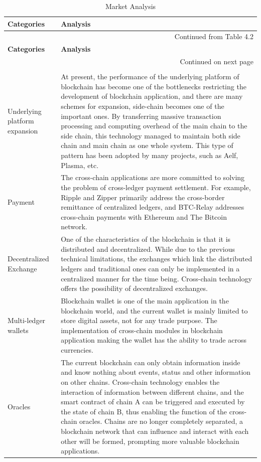 \begin{longtable}{l|p{7cm}}
 \caption{\label{tab:app}Market Analysis}\\
 \toprule
\textbf{Categories} &\textbf{Analysis}\\
\midrule\endfirsthead
\multicolumn{2}{r}{Continued from Table 4.2}\\\hline 
\textbf{Categories} &\textbf{Analysis}\\
\midrule\endhead
\multicolumn{2}{r}{Continued on next page}\\
\endfoot
\multicolumn{2}{c}{}\\\endlastfoot
Underlying platform expansion & At present, the performance of the underlying platform of blockchain has become one of the bottlenecks restricting the development of blockchain application, and there are many schemes for expansion, side-chain becomes one of the important ones. By transferring massive transaction processing and computing overhead of the main chain to the side chain, this technology managed to maintain both side chain and main chain as one whole system. This type of pattern has been adopted by many projects, such as Aelf, Plasma, etc.\\
\midrule
Payment & The cross-chain applications are more committed to solving the problem of cross-ledger payment settlement. For example, Ripple and Zipper primarily address the cross-border remittance of centralized ledgers, and BTC-Relay addresses cross-chain payments with Ethereum and The Bitcoin network.\\
\midrule
Decentralized Exchange & One of the characteristics of the blockchain is that it is distributed and decentralized. While due to the previous technical limitations, the exchanges which link the distributed ledgers and traditional ones can only be implemented in a centralized manner for the time being. Cross-chain technology offers the possibility of decentralized exchanges.\\
\midrule
Multi-ledger wallets & Blockchain wallet is one of the main application in the blockchain world, and the current wallet is mainly limited to store digital assets, not for any trade purpose. The implementation of cross-chain modules in blockchain application making the wallet has the ability to trade across currencies.\\
\midrule
Oracles & The current blockchain can only obtain information inside and know nothing about events, status and other information on other chains. Cross-chain technology enables the interaction of information between different chains, and the smart contract of chain A can be triggered and executed by the state of chain B, thus enabling the function of the cross-chain oracles. Chains are no longer completely separated, a blockchain network that can influence and interact with each other will be formed, prompting more valuable blockchain applications.\\

\end{longtable}
